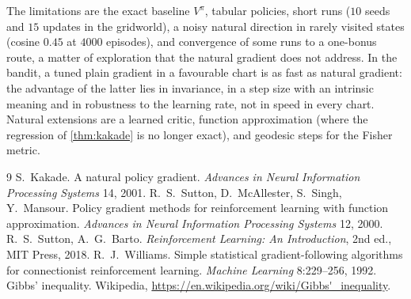 \documentclass[11pt,a4paper]{article}
\numberwithin{equation}{section}
\theoremstyle{plain}
\theoremstyle{definition}
\theoremstyle{remark}
\begin{document}
The limitations are the exact baseline $V^\pi$, tabular policies, short runs ($10$ seeds and $15$ updates in the gridworld), a noisy natural direction in rarely visited states (cosine $0.45$ at $4000$ episodes), and convergence of some runs to a one-bonus route, a matter of exploration that the natural gradient does not address. In the bandit, a tuned plain gradient in a favourable chart is as fast as
natural gradient: the advantage of the latter lies in invariance, in a step size with an intrinsic meaning and in robustness to the learning rate, not in speed in every chart. Natural extensions are a learned critic, function approximation (where the regression of \cref{thm:kakade} is no longer exact), and geodesic steps for the Fisher metric.

\clearpage

\begin{thebibliography}{9}
 S.~Kakade. A natural policy gradient. \emph{Advances in Neural Information Processing Systems} 14, 2001.
 R.~S.~Sutton, D.~McAllester, S.~Singh, Y.~Mansour. Policy gradient methods for reinforcement learning with function approximation. \emph{Advances in Neural Information Processing Systems} 12, 2000.
 R.~S.~Sutton, A.~G.~Barto. \emph{Reinforcement Learning: An Introduction}, 2nd ed., MIT Press, 2018.
 R.~J.~Williams. Simple statistical gradient-following algorithms for connectionist reinforcement learning. \emph{Machine Learning} 8:229--256, 1992.
 Gibbs' inequality. Wikipedia, \url{https://en.wikipedia.org/wiki/Gibbs'_inequality}.
\end{thebibliography}
\end{document}
